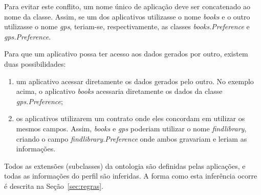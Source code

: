 Para evitar este conflito, um nome único de aplicação deve ser concatenado ao nome da classe. Assim, se um dos aplicativos utilizasse o nome {\em books} e o outro utilizasse o nome {\em gps}, teriam-se, respectivamente, as classes {\em books.Preference} e {\em gps.Preference}.

Para que um aplicativo possa ter acesso aos dados gerados por outro, existem duas possibilidades:

\begin{enumerate}

  \item um aplicativo acessar diretamente os dados gerados pelo outro. No exemplo acima, o aplicativo {\em books} acessaria diretamente os dados da classe {\em gps.Preference};

  \item os aplicativos utilizarem um contrato onde eles concordam em utilizar os mesmos campos. Assim, {\em books} e {\em gps} poderiam utilizar o nome {\em findlibrary}, criando o campo {\em findlibrary.Preference} onde ambos gravariam e leriam as informações.

\end{enumerate}

Todos as extensões (subclasses) da ontologia são definidas pelas aplicações, e todas as informações do perfil são inferidas. A forma como esta inferência ocorre é descrita na Seção~\ref{sec:regras}.

